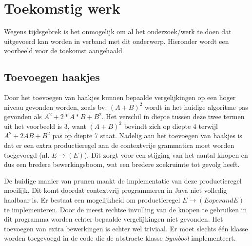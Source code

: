 \documentclass[Main.tex]{subfiles}
\begin{document}
\section{Toekomstig werk}
Wegens tijdsgebrek is het onmogelijk om al het onderzoek/werk te doen dat uitgevoerd kan worden in verband met dit onderwerp. Hieronder wordt een voorbeeld voor de toekomst aangehaald.

\subsection*{Toevoegen haakjes}
Door het toevoegen van haakjes kunnen bepaalde vergelijkingen op een hoger niveau gevonden worden, zoals bv. $(A+B)^2$ wordt in het huidige algoritme pas gevonden als $A^{2}+2 \ast A \ast B+B^{2}$. Het verschil in diepte tussen deze twee termen uit het voorbeeld is 3, want $(A+B)^2$ bevindt zich op diepte 4 terwijl $A^{2}+2AB+B^{2}$ pas op diepte 7 staat. Nadelig aan het toevoegen van haakjes is dat er een extra productieregel aan de contextvrije grammatica moet worden toegevoegd (nl. $E \rightarrow (E)$). Dit zorgt voor een stijging van het aantal knopen en dus een bredere bewerkingsboom, wat een bredere zoekruimte tot gevolg heeft. 

\par De huidige manier van prunen maakt de implementatie van deze productieregel moeilijk. Dit komt doordat contextvrij programmeren in Java niet volledig haalbaar is. Er bestaat een mogelijkheid om productieregel $E \rightarrow (E operand E)$ te implementeren. Door de meest rechtse invulling van de knopen te gebruiken in dit programma worden echter bepaalde vergelijkingen niet gevonden. Het toevoegen van extra bewerkingen is echter wel triviaal. Er moet slechts \'e\'en klasse worden toegevoegd in de code die de abstracte klasse \textit{Symbool} implementeert.
\end{document}
